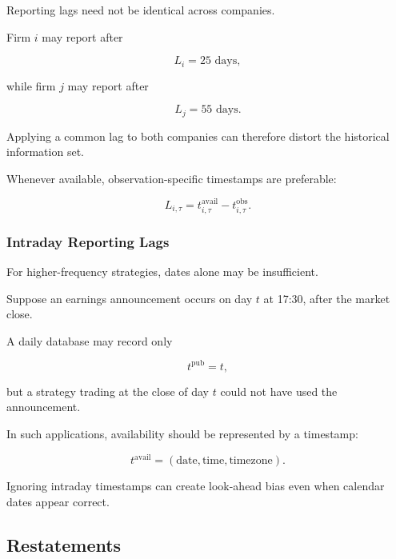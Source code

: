 \documentclass[11pt,a4paper]{article}
\begin{document}
Reporting lags need not be identical across companies.

Firm $i$ may report after

\begin{equation}
L_i=25\text{ days},
\end{equation}

while firm $j$ may report after

\begin{equation}
L_j=55\text{ days}.
\end{equation}

Applying a common lag to both companies can therefore distort the historical
information set.

Whenever available, observation-specific timestamps are preferable:

\begin{equation}
\boxed{
L_{i,\tau}
=
t_{i,\tau}^{\mathrm{avail}}
-
t_{i,\tau}^{\mathrm{obs}}.
}
\end{equation}


\subsubsection{Intraday Reporting Lags}

For higher-frequency strategies, dates alone may be insufficient.

Suppose an earnings announcement occurs on day $t$ at 17:30, after the market
close.

A daily database may record only

\begin{equation}
t^{\mathrm{pub}}=t,
\end{equation}

but a strategy trading at the close of day $t$ could not have used the
announcement.

In such applications, availability should be represented by a timestamp:

\begin{equation}
\boxed{
t^{\mathrm{avail}}
=
(\text{date},\text{time},\text{timezone}).
}
\end{equation}

Ignoring intraday timestamps can create look-ahead bias even when calendar
dates appear correct.


\subsection{Restatements}
\label{subsec:restatements}
\end{document}
